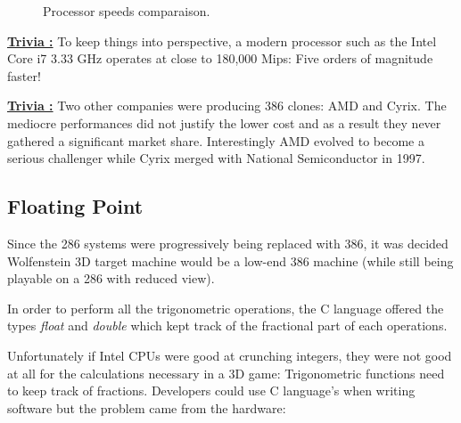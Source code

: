 \documentclass[book.tex]{subfiles}
\begin{document}


\begin{figure}[H]
\centering
   \caption{Processor speeds comparaison.} \label{fig:mips}
 \end{figure}

 \textbf{\underline{Trivia :}} To keep things into perspective, a modern processor such as the Intel Core i7 3.33 GHz operates at close to 180,000 Mips: Five orders of magnitude faster!

 \bigskip

\textbf{\underline{Trivia :}}  Two other companies were producing 386 clones: AMD and Cyrix. The mediocre performances did not justify the lower cost and as a result they never gathered a significant market share. Interestingly AMD evolved to become a serious challenger while Cyrix merged with National Semiconductor in 1997.
  \subsection{Floating Point}
  
  Since the 286 systems were progressively being replaced with 386, it was decided Wolfenstein 3D target machine would be a low-end 386 machine (while still being playable on a 286 with reduced view). 
  \bigskip

  In order to perform all the trigonometric operations, the C language offered the types \emph{float} and \emph{double} which kept track of the fractional part of each operations.


  

  Unfortunately if Intel CPUs were good at crunching integers, they were not good at all for the calculations necessary in a 3D game: Trigonometric functions need to keep track of fractions. Developers could use C language's  when writing software but the problem came from the hardware:\bigskip
\end{document}
